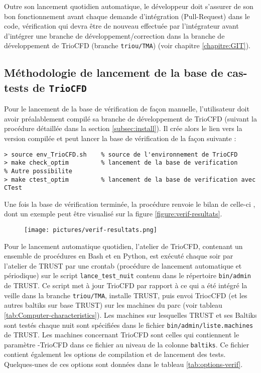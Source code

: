 Outre son lancement quotidien automatique, le d\'eveloppeur doit s'assurer de son bon fonctionnement avant chaque demande d'int\'egration (Pull-Request) dans le code, v\'erification qui devra \^etre de nouveau effectu\'ee par l'int\'egrateur avant d'int\'egrer une branche de d\'eveloppement/correction dans la branche de d\'eveloppement de TrioCFD (branche \texttt{triou/TMA}) (voir chapitre \ref{chapitre:GIT}).

\subsection{Méthodologie de lancement de la base de cas-tests de \texttt{TrioCFD}}
Pour le lancement de la base de vérification de façon manuelle, l'utilisateur doit avoir préalablement compilé sa branche de développement de TrioCFD (suivant la procédure détaillée dans la section \ref{subsec:install}). Il crée alors le lien vers la version compilée et peut lancer la base de vérification de la façon suivante :
\footnotesize
\begin{lstlisting}
> source env_TrioCFD.sh    % source de l'environnement de TrioCFD
> make check_optim         % lancement de la base de verification
% Autre possibilite
> make ctest_optim         % lancement de la base de verification avec CTest
\end{lstlisting}
\normalsize

Une fois la base de vérification terminée, la procédure renvoie le bilan de celle-ci , dont un exemple peut être visualisé sur la figure \ref{figure:verif-resultats}.\medskip\newline

\begin{figure}[H]
   \centering
   \texttt{[image: pictures/verif-resultats.png]}
   \vspace*{0.2cm}
\end{figure}


Pour le lancement automatique quotidien, l'atelier de TrioCFD,
contenant un ensemble de procédures en Bash et en Python,
est exécuté chaque soir par l'atelier de TRUST par une crontab (procédure de lancement automatique et périodique)
sur le script \texttt{lance\_test\_nuit} contenu dans le répertoire \texttt{bin/admin} de TRUST.
Ce script met à jour TrioCFD par rapport à ce qui a été intégré la veille dans la branche \texttt{triou/TMA},
installe TRUST, puis envoi TriocCFD (et les autres baltiks sur base TRUST) sur les machines du parc (voir tableau \ref{tab:Computer-characteristics}).
Les machines sur lesquelles TRUST et ses Baltiks sont testés chaque nuit sont spécifiées dans le fichier \texttt{bin/admin/liste.machines} de TRUST.
Les machines concernant TrioCFD sont celles qui contiennent le paramètre -TrioCFD
dans ce fichier au niveau de la colonne \texttt{baltiks}.
Ce fichier contient également les options de compilation
et de lancement des tests. Quelques-unes de ces options sont données dans le tableau \ref{tab:options-verif}.

